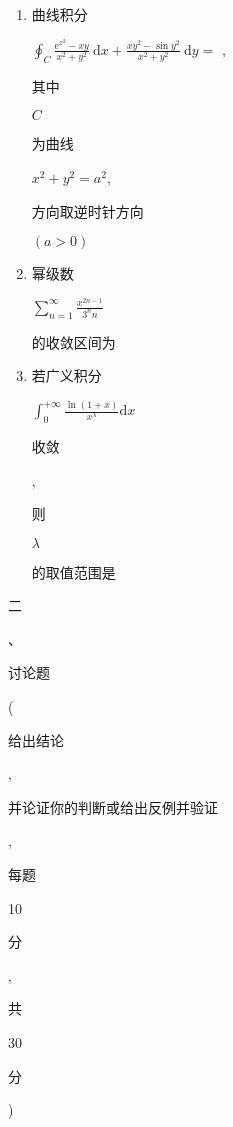 \documentclass[10pt]{article}
\begin{document}
\begin{enumerate}
  \item \begin{CJK}{UTF8}{mj}曲线积分\end{CJK} $\oint_{C} \frac{\mathrm{e}^{x^{2}}-x y}{x^{2}+y^{2}} \mathrm{~d} x+\frac{x y^{2}-\sin y^{2}}{x^{2}+y^{2}} \mathrm{~d} y=$ , \begin{CJK}{UTF8}{mj}其中\end{CJK} $C$ \begin{CJK}{UTF8}{mj}为曲线\end{CJK} $x^{2}+y^{2}=a^{2}$, \begin{CJK}{UTF8}{mj}方向取逆时针方向\end{CJK} $(a>0)$

  \item \begin{CJK}{UTF8}{mj}幂级数\end{CJK} $\sum_{n=1}^{\infty} \frac{x^{2 n-1}}{3^{n} n}$ \begin{CJK}{UTF8}{mj}的收敛区间为\end{CJK}

  \item \begin{CJK}{UTF8}{mj}若广义积分\end{CJK} $\int_{0}^{+\infty} \frac{\ln (1+x)}{x^{\lambda}} \mathrm{d} x$ \begin{CJK}{UTF8}{mj}收敛\end{CJK}, \begin{CJK}{UTF8}{mj}则\end{CJK} $\lambda$ \begin{CJK}{UTF8}{mj}的取值范围是\end{CJK}

\end{enumerate}
\begin{CJK}{UTF8}{mj}二\end{CJK}、\begin{CJK}{UTF8}{mj}讨论题\end{CJK} (\begin{CJK}{UTF8}{mj}给出结论\end{CJK}, \begin{CJK}{UTF8}{mj}并论证你的判断或给出反例并验证\end{CJK}, \begin{CJK}{UTF8}{mj}每题\end{CJK} 10 \begin{CJK}{UTF8}{mj}分\end{CJK}, \begin{CJK}{UTF8}{mj}共\end{CJK} 30 \begin{CJK}{UTF8}{mj}分\end{CJK})
\end{document}
